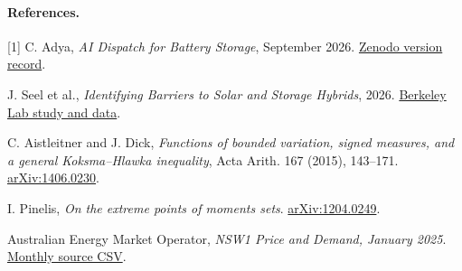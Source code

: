 \documentclass[11pt]{article}
\begin{document}
\paragraph{References.}
[1] C. Adya, \emph{AI Dispatch for Battery Storage}, September 2026. \href{https://doi.org/10.5281/zenodo.24380609}{Zenodo version record}.\par\noindent
[2] J. Seel et al., \emph{Identifying Barriers to Solar and Storage Hybrids}, 2026. \href{https://emp.lbl.gov/utility-scale-storage}{Berkeley Lab study and data}.\par\noindent
[3] C. Aistleitner and J. Dick, \emph{Functions of bounded variation, signed measures, and a general Koksma--Hlawka inequality}, Acta Arith. 167 (2015), 143--171. \href{https://arxiv.org/abs/1406.0230}{arXiv:1406.0230}.\par\noindent
[4] I. Pinelis, \emph{On the extreme points of moments sets}. \href{https://arxiv.org/abs/1204.0249}{arXiv:1204.0249}.\par\noindent
[5] Australian Energy Market Operator, \emph{NSW1 Price and Demand, January 2025}. \href{https://aemo.com.au/aemo/data/nem/priceanddemand/PRICE_AND_DEMAND_202501_NSW1.csv}{Monthly source CSV}.
\end{document}
